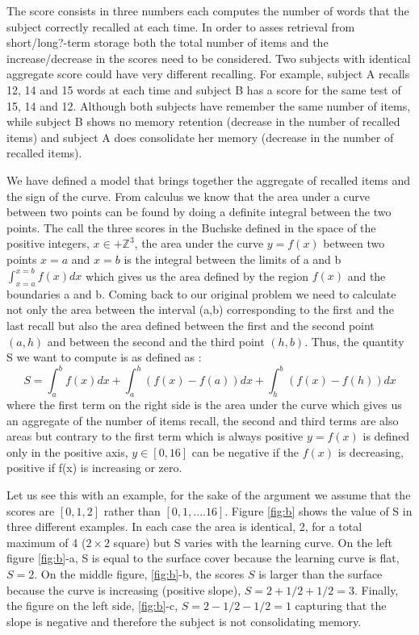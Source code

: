 \documentclass[11pt]{article}
\theoremstyle{definition}
\theoremstyle{remark}
\begin{document}
The score consists in three numbers each computes the number of words that the subject correctly recalled at each time. In order to asses retrieval from short/long?-term storage both the total number of items and the increase/decrease in the scores need to be considered. Two subjects with identical aggregate score could have very different recalling. For example, subject A recalls 12, 14 and 15 words at each time and subject B has a score for the same test of 15, 14 and 12. Although both subjects have remember the same number of items, while subject B shows no memory retention (decrease in the number of recalled items) and subject A does consolidate her memory (decrease in the number of recalled items).

We have defined a model that brings together the aggregate of recalled items and the sign of the curve. From calculus we know that the area under a curve between two points can be found by doing a definite integral between the two points. 
The call the three scores in the Buchske  defined in the space of the positive integers, $x \in +\mathbb{Z}^3$, the area under the curve $y = f(x)$ between two points $x=a$ and $x=b$ is the integral between the limits of a and b$\int_{x=a}^{x=b}f(x)dx$ which gives us the area defined by the region $f(x)$ and the boundaries a and b.
Coming back to our original problem we need to calculate not only the area between the interval (a,b) corresponding to the first and the last recall but also the area defined between the first and the second point $(a,h)$ and between the second and the third point $(h,b)$.  
Thus, the quantity S we want to compute is as defined as :
\begin{equation}
S = \int_{a}^{b}f(x)dx + \int_{a}^{h}(f(x) - f(a))dx + \int_{h}^{b}(f(x)-f(h))dx
\label{eq:buchske}
\end{equation}
where the first term on the right side is the area under the curve which gives us an aggregate of the number of items recall, the second and third terms are also areas but contrary to the first term which is always positive $y =f(x)$ is defined only in the positive axis, $y \in [0,16]$ can be negative if the $f(x)$ is decreasing, positive if f(x) is increasing or zero.

Let us see this with an example, for the sake of the argument we assume that the scores are $[0,1,2]$ rather than $[0,1,....16]$. Figure \ref{fig:b} shows the value of S in three different examples. In each case the area is identical, 2, for a total maximum of 4 ($2\times2$ square) but S varies with the learning curve. On the left figure \ref{fig:b}-a,
S is equal to the surface cover because the learning curve is flat, $S=2$. On the middle figure, \ref{fig:b}-b, the scores $S$ is larger than the surface because the curve is increasing (positive slope), $S=2+1/2+1/2=3$. Finally, the figure on the left side, \ref{fig:b}-c, $S=2-1/2-1/2=1$ capturing that the slope is negative and therefore the subject is not consolidating memory.      
  
\end{document}
